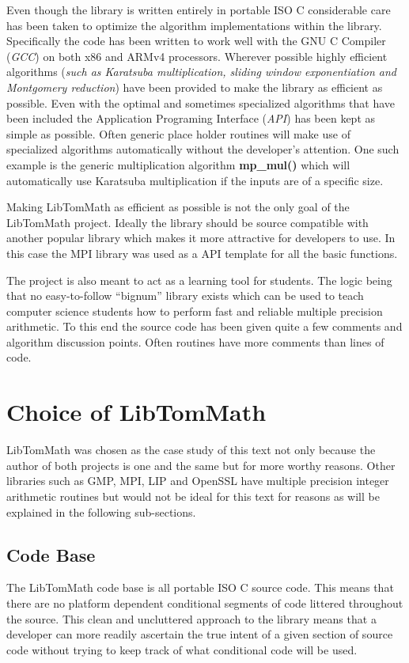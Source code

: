 \documentclass[b5paper]{book}
\begin{document}
Even though the library is written entirely in portable ISO C considerable care has been taken to 
optimize the algorithm implementations within the library.  Specifically the code has been written to work well with
the GNU C Compiler (\textit{GCC}) on both x86 and ARMv4 processors.  Wherever possible highly efficient 
algorithms (\textit{such as Karatsuba multiplication, sliding window exponentiation and Montgomery reduction}) have 
been provided to make the library as efficient as possible.  Even with the optimal and sometimes specialized 
algorithms that have been included the Application Programing Interface (\textit{API}) has been kept as simple as possible.  
Often generic place holder routines will make use of specialized algorithms automatically without the developer's
attention.  One such example is the generic multiplication algorithm \textbf{mp\_mul()} which will automatically use 
Karatsuba multiplication if the inputs are of a specific size.

Making LibTomMath as efficient as possible is not the only goal of the LibTomMath project.  Ideally the library should 
be source compatible with another popular library which makes it more attractive for developers to use.  In this case the
MPI library was used as a API template for all the basic functions.

The project is also meant to act as a learning tool for students.  The logic being that no easy-to-follow ``bignum'' 
library exists which can be used to teach computer science students how to perform fast and reliable multiple precision 
arithmetic.  To this end the source code has been given quite a few comments and algorithm discussion points.  Often routines have 
more comments than lines of code.

\section{Choice of LibTomMath}
LibTomMath was chosen as the case study of this text not only because the author of both projects is one and the same but
for more worthy reasons.  Other libraries such as GMP, MPI, LIP and OpenSSL have multiple precision 
integer arithmetic routines but would not be ideal for this text for reasons as will be explained in the 
following sub-sections.

\subsection{Code Base}
The LibTomMath code base is all portable ISO C source code.  This means that there are no platform dependent conditional
segments of code littered throughout the source.  This clean and uncluttered approach to the library means that a
developer can more readily ascertain the true intent of a given section of source code without trying to keep track of
what conditional code will be used.
\end{document}
